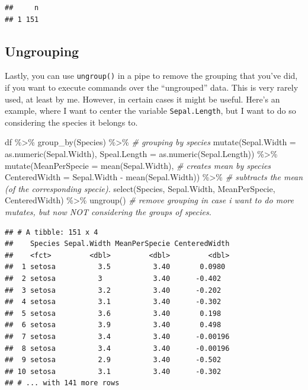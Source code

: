 \documentclass[
]{book}
\newenvironment{Shaded}{\begin{snugshade}}{\end{snugshade}}
\newcommand{\AttributeTok}[1]{\textcolor[rgb]{0.77,0.63,0.00}{#1}}
\newcommand{\CommentTok}[1]{\textcolor[rgb]{0.56,0.35,0.01}{\textit{#1}}}
\newcommand{\FunctionTok}[1]{\textcolor[rgb]{0.00,0.00,0.00}{#1}}
\newcommand{\NormalTok}[1]{#1}
\newcommand{\SpecialCharTok}[1]{\textcolor[rgb]{0.00,0.00,0.00}{#1}}
\begin{document}
\begin{verbatim}
##     n
## 1 151
\end{verbatim}

\hypertarget{ungrouping}{%
\subsection{Ungrouping}\label{ungrouping}}

Lastly, you can use \texttt{ungroup()} in a pipe to remove the grouping that you've did, if you want to execute commands over the ``ungrouped'' data.
This is very rarely used, at least by me.
However, in certain cases it might be useful.
Here's an example, where I want to center the variable \texttt{Sepal.Length}, but I want to do so considering the species it belongs to.

\begin{Shaded}
\begin{Highlighting}[]
\NormalTok{df }\SpecialCharTok{\%\textgreater{}\%} 
  \FunctionTok{group\_by}\NormalTok{(Species) }\SpecialCharTok{\%\textgreater{}\%}  \CommentTok{\# grouping by species}
  \FunctionTok{mutate}\NormalTok{(}\AttributeTok{Sepal.Width =} \FunctionTok{as.numeric}\NormalTok{(Sepal.Width),}
         \AttributeTok{Speal.Length =} \FunctionTok{as.numeric}\NormalTok{(Sepal.Length)) }\SpecialCharTok{\%\textgreater{}\%} 
  \FunctionTok{mutate}\NormalTok{(}\AttributeTok{MeanPerSpecie =} \FunctionTok{mean}\NormalTok{(Sepal.Width),  }\CommentTok{\# creates mean by species}
         \AttributeTok{CenteredWidth =}\NormalTok{ Sepal.Width }\SpecialCharTok{{-}} \FunctionTok{mean}\NormalTok{(Sepal.Width)) }\SpecialCharTok{\%\textgreater{}\%}   \CommentTok{\# subtracts the mean (of the corresponding specie).}
  \FunctionTok{select}\NormalTok{(Species, Sepal.Width, MeanPerSpecie, CenteredWidth) }\SpecialCharTok{\%\textgreater{}\%} 
  \FunctionTok{ungroup}\NormalTok{()  }\CommentTok{\# remove grouping in case i want to do more mutates, but now NOT considering the groups of species.}
\end{Highlighting}
\end{Shaded}

\begin{verbatim}
## # A tibble: 151 x 4
##    Species Sepal.Width MeanPerSpecie CenteredWidth
##    <fct>         <dbl>         <dbl>         <dbl>
##  1 setosa          3.5          3.40       0.0980 
##  2 setosa          3            3.40      -0.402  
##  3 setosa          3.2          3.40      -0.202  
##  4 setosa          3.1          3.40      -0.302  
##  5 setosa          3.6          3.40       0.198  
##  6 setosa          3.9          3.40       0.498  
##  7 setosa          3.4          3.40      -0.00196
##  8 setosa          3.4          3.40      -0.00196
##  9 setosa          2.9          3.40      -0.502  
## 10 setosa          3.1          3.40      -0.302  
## # ... with 141 more rows
\end{verbatim}
\end{document}
